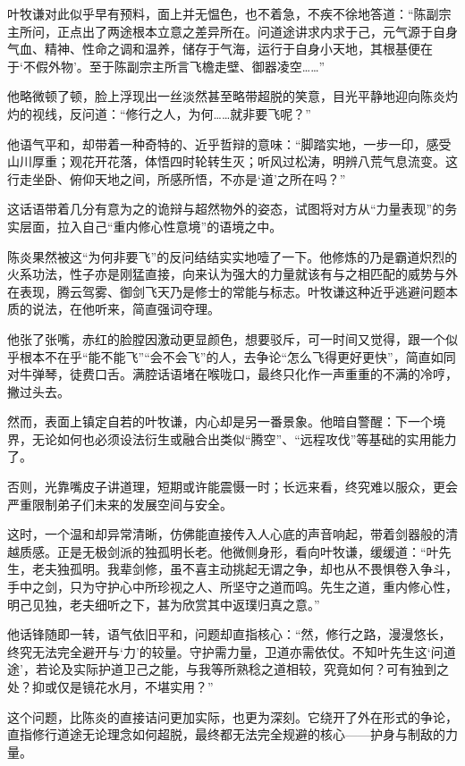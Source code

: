 叶牧谦对此似乎早有预料，面上并无愠色，也不着急，不疾不徐地答道：“陈副宗主所问，正点出了两途根本立意之差异所在。问道途讲求内求于己，元气源于自身气血、精神、性命之调和温养，储存于气海，运行于自身小天地，其根基便在于‘不假外物’。至于陈副宗主所言飞檐走壁、御器凌空……”

他略微顿了顿，脸上浮现出一丝淡然甚至略带超脱的笑意，目光平静地迎向陈炎灼灼的视线，反问道：“修行之人，为何……就非要飞呢？”

他语气平和，却带着一种奇特的、近乎哲辩的意味：“脚踏实地，一步一印，感受山川厚重；观花开花落，体悟四时轮转生灭；听风过松涛，明辨八荒气息流变。这行走坐卧、俯仰天地之间，所感所悟，不亦是‘道’之所在吗？”

这话语带着几分有意为之的诡辩与超然物外的姿态，试图将对方从“力量表现”的务实层面，拉入自己“重内修心性意境”的语境之中。

陈炎果然被这“为何非要飞”的反问结结实实地噎了一下。他修炼的乃是霸道炽烈的火系功法，性子亦是刚猛直接，向来认为强大的力量就该有与之相匹配的威势与外在表现，腾云驾雾、御剑飞天乃是修士的常能与标志。叶牧谦这种近乎逃避问题本质的说法，在他听来，简直强词夺理。

他张了张嘴，赤红的脸膛因激动更显颜色，想要驳斥，可一时间又觉得，跟一个似乎根本不在乎“能不能飞”“会不会飞”的人，去争论“怎么飞得更好更快”，简直如同对牛弹琴，徒费口舌。满腔话语堵在喉咙口，最终只化作一声重重的不满的冷哼，撇过头去。

然而，表面上镇定自若的叶牧谦，内心却是另一番景象。他暗自警醒：下一个境界，无论如何也必须设法衍生或融合出类似“腾空”、“远程攻伐”等基础的实用能力了。

否则，光靠嘴皮子讲道理，短期或许能震慑一时；长远来看，终究难以服众，更会严重限制弟子们未来的发展空间与安全。

\vspace{2em}

这时，一个温和却异常清晰，仿佛能直接传入人心底的声音响起，带着剑器般的清越质感。正是无极剑派的独孤明长老。他微侧身形，看向叶牧谦，缓缓道：“叶先生，老夫独孤明。我辈剑修，虽不喜主动挑起无谓之争，却也从不畏惧卷入争斗，手中之剑，只为守护心中所珍视之人、所坚守之道而鸣。先生之道，重内修心性，明己见独，老夫细听之下，甚为欣赏其中返璞归真之意。”

他话锋随即一转，语气依旧平和，问题却直指核心：“然，修行之路，漫漫悠长，终究无法完全避开与‘力’的较量。守护需力量，卫道亦需依仗。不知叶先生这‘问道途’，若论及实际护道卫己之能，与我等所熟稔之道相较，究竟如何？可有独到之处？抑或仅是镜花水月，不堪实用？”

这个问题，比陈炎的直接诘问更加实际，也更为深刻。它绕开了外在形式的争论，直指修行道途无论理念如何超脱，最终都无法完全规避的核心——护身与制敌的力量。

